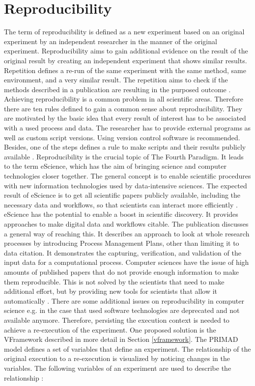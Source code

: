 \documentclass[draft,final]{vutinfth} %
\begin{document}
\section{Reproducibility}\label{Reproducibility}
The term of reproducibility is defined as a new experiment based on an original experiment by an independent researcher in the manner of the original experiment. Reproducibility aims to gain additional evidence on the result of the original result by creating an independent experiment that shows similar results. Repetition defines a re-run of the same experiment with the same method, same environment, and a very similar result. The repetition aims to check if the methods described in a publication are resulting in the purposed outcome \cite{6064509}. 
Achieving reproducibility is a common problem in all scientific areas. Therefore there are ten rules defined to gain a common sense about reproducibility. They are motivated by the basic idea that every result of interest has to be associated with a used process and data. The researcher has to provide external programs as well as custom script versions. Using version control software is recommended. Besides, one of the steps defines a rule to make scripts and their results publicly available \cite{10.1371/journal.pcbi.1003285}. 
Reproducibility is the crucial topic of The Fourth Paradigm. It leads to the term eScience, which has the aim of bringing science and computer technologies closer together. The general concept is to enable scientific procedures with new information technologies used by data-intensive sciences. The expected result of eScience is to get all scientific papers publicly available, including the necessary data and workflows, so that scientists can interact more efficiently \cite{noauthororeditorfourth}. 
eScience has the potential to enable a boost in scientific discovery. It provides approaches to make digital data and workflows citable. The publication \cite{Rauber2015RepeatabilityAR} discusses a general way of reaching this. It describes an approach to look at whole research processes by introducing Process Management Plans, other than limiting it to data citation. It demonstrates the capturing, verification, and validation of the input data for a computational process.
Computer sciences have the issue of high amounts of published papers that do not provide enough information to make them reproducible. This is not solved by the scientists that need to make additional effort, but by providing new tools for scientists that allow it automatically  \cite{MIKSA201725}. There are some additional issues on reproducibility in computer science e.g. in the case that used software technologies are deprecated and not available anymore. Therefore, persisting the execution context is needed to achieve a re-execution of the experiment. One proposed solution is the VFramework described in more detail in Section \ref{vframework}. 
The PRIMAD model defines a set of variables that define an experiment. The relationship of the original execution to a re-execution is visualized by noticing changes in the variables. The following variables of an experiment are used to describe the relationship \cite{primad}:
\end{document}
